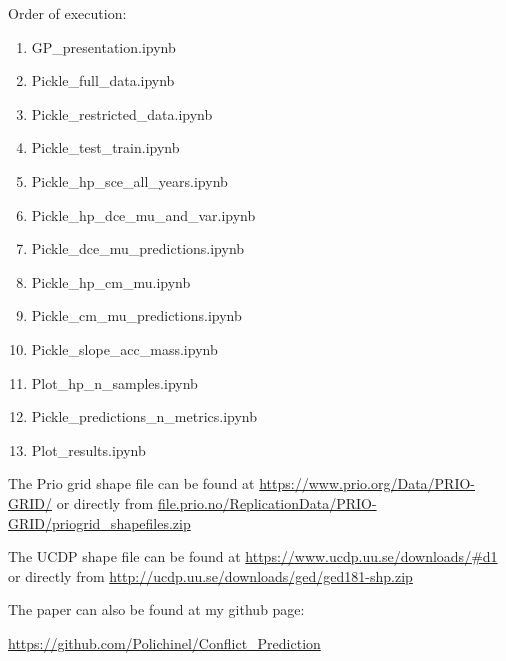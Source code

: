 \documentclass[a4paper]{article}
\begin{document}
Order of execution:
\begin{enumerate}
\item GP\_presentation.ipynb
\item Pickle\_full\_data.ipynb
\item Pickle\_restricted\_data.ipynb
\item Pickle\_test\_train.ipynb
\item Pickle\_hp\_sce\_all\_years.ipynb
\item Pickle\_hp\_dce\_mu\_and\_var.ipynb
\item Pickle\_dce\_mu\_predictions.ipynb
\item Pickle\_hp\_cm\_mu.ipynb
\item Pickle\_cm\_mu\_predictions.ipynb
\item Pickle\_slope\_acc\_mass.ipynb
\item Plot\_hp\_n\_samples.ipynb
\item Pickle\_predictions\_n\_metrics.ipynb
\item Plot\_results.ipynb
\end{enumerate}

The Prio grid shape file can be found at \hyperlink{https://www.prio.org/Data/PRIO-GRID/}{https://www.prio.org/Data/PRIO-GRID/} or directly from \hyperlink{file.prio.no/ReplicationData/PRIO-GRID/priogrid_shapefiles.zip}{file.prio.no/ReplicationData/PRIO-GRID/priogrid\_shapefiles.zip}\par

The UCDP shape file can be found at \hyperlink{https://www.ucdp.uu.se/downloads/\#d1}{https://www.ucdp.uu.se/downloads/\#d1} or directly from \hyperlink{http://ucdp.uu.se/downloads/ged/ged181-shp.zip}{http://ucdp.uu.se/downloads/ged/ged181-shp.zip}\par

The paper \cite{Maase} can also be found at my github page:\par

\hyperlink{https://github.com/Polichinel/Conflict_Prediction}{https://github.com/Polichinel/Conflict\_Prediction}

\pagebreak


\end{document}
